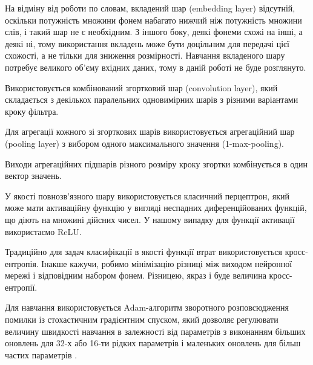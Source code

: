 На відміну від роботи по словам, вкладений шар (embedding layer) відсутній, оскільки потужність множини фонем набагато нижчий ніж потужність множини слів, і такий шар не є необхідним. З іншого боку, деякі фонеми схожі на інші, а деякі ні, тому використання вкладень може бути доцільним для передачі цієї схожості, а не тільки для зниження розмірності. Навчання вкладеного шару потребує великого об’єму вхідних даних, тому в даній роботі не буде розглянуто.

Використовується комбінований згортковий шар (convolution layer), який складається з декількох паралельних одновимірних шарів з різними варіантами кроку фільтра.

Для агрегації кожного зі згорткових шарів використовується агрегаційний шар (pooling layer) з вибором одного максимального значення (1-max-pooling).

Виходи агрегаційних підшарів різного розміру кроку згортки комбінується в один вектор значень.

У якості повнозв’язного шару використовується класичний перцептрон, який може мати активаційну функцію у вигляді неспадних диференційованих функцій, що діють на множині дійсних чисел. У нашому випадку для функції активації використаємо ReLU.

Традиційно для задач класифікації в якості функції втрат використовується кросс-ентропія. Інакше кажучи, робимо мінімізацію різниці між виходом нейронної мережі і відповідним набором фонем. Різницею, якраз і буде величина кросс-ентропії.

Для навчання використовується Adam-алгоритм зворотного розповсюдження помилки із стохастичним градієнтним спуском, який дозволяє регулювати величину швидкості навчання в залежності від параметрів з виконанням більших оновлень для 32-х або 16-ти рідких параметрів і маленьких оновлень для більш частих параметрів \cite{art4}.

